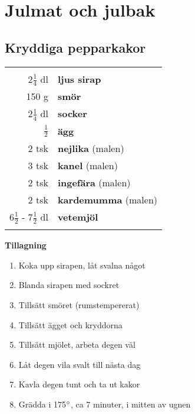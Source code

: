 
\section{Julmat och julbak}

\clearpage

\subsection{Kryddiga pepparkakor}

\begin{table}[H]
	\begin{tabular}{rl}
	\hline
	&\\
		2$\frac{1}{4}$ dl & \textbf{ljus sirap} \\
		150 g & \textbf{smör} \\
		2$\frac{1}{4}$ dl & \textbf{socker} \\
		$\frac{1}{2}$ & \textbf{ägg} \\
		2 tsk & \textbf{nejlika} (malen) \\
		3 tsk & \textbf{kanel} (malen) \\
		2 tsk & \textbf{ingefära} (malen) \\
		2 tsk & \textbf{kardemumma} (malen) \\
		6$\frac{1}{2}$ - 7$\frac{1}{2}$ dl & \textbf{vetemjöl} \\
	&\\
	\hline
	\end{tabular}
\end{table}

\begin{multicols*}{2}

\noindent \textbf{Tillagning}
\begin{enumerate}
	\itemsep0cm
	\item Koka upp sirapen, låt svalna något
	\item Blanda sirapen med sockret
	\item Tillsätt smöret (rumstempererat)
	\item Tillsätt ägget och kryddorna
	\item Tillsätt mjölet, arbeta degen väl
	\item Låt degen vila svalt till nästa dag
	\item Kavla degen tunt och ta ut kakor
	\item Grädda i 175$\degree$, ca 7 minuter, i mitten av ugnen
\end{enumerate}

\end{multicols*}

